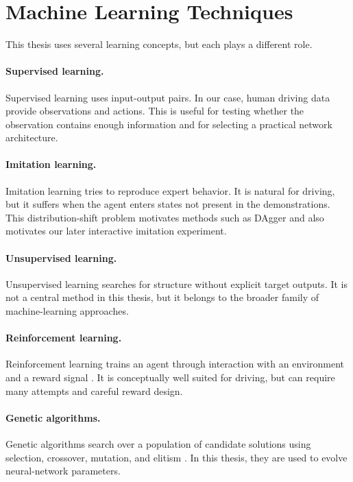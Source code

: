 \section{Machine Learning Techniques}

This thesis uses several learning concepts, but each plays a different role.

\paragraph{Supervised learning.}
Supervised learning uses input-output pairs. In our case, human driving data provide observations and actions. This is useful for testing whether the observation contains enough information and for selecting a practical network architecture.

\paragraph{Imitation learning.}
Imitation learning tries to reproduce expert behavior. It is natural for driving, but it suffers when the agent enters states not present in the demonstrations. This distribution-shift problem motivates methods such as DAgger \cite{ross2011dagger} and also motivates our later interactive imitation experiment.

\paragraph{Unsupervised learning.}
Unsupervised learning searches for structure without explicit target outputs. It is not a central method in this thesis, but it belongs to the broader family of machine-learning approaches.

\paragraph{Reinforcement learning.}
Reinforcement learning trains an agent through interaction with an environment and a reward signal \cite{sutton_barto2018rl}. It is conceptually well suited for driving, but can require many attempts and careful reward design.

\paragraph{Genetic algorithms.}
Genetic algorithms search over a population of candidate solutions using selection, crossover, mutation, and elitism \cite{goldberg1989ga}. In this thesis, they are used to evolve neural-network parameters.

